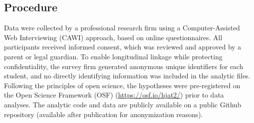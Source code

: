 \documentclass[
  13pt,
]{article}
\begin{document}
\begin{table}[H]

\caption{\label{tbl-cohort}Descriptive statistics for cohort level}


\end{table}%

\subsection{Procedure}\label{procedure}

Data were collected by a professional research firm using a
Computer-Assisted Web Interviewing (CAWI) approach, based on online
questionnaires. All participants received informed consent, which was
reviewed and approved by a parent or legal guardian. To enable
longitudinal linkage while protecting confidentiality, the survey firm
generated anonymous unique identifiers for each student, and no directly
identifying information was included in the analytic files. Following
the principles of open science, the hypotheses were pre-registered on
the Open Science Framework (OSF) (\url{https://osf.io/hjat2/}) prior to
data analyses. The analytic code and data are publicly available on a
public Github repository (available after publication for anonymization
reasons).
\end{document}
